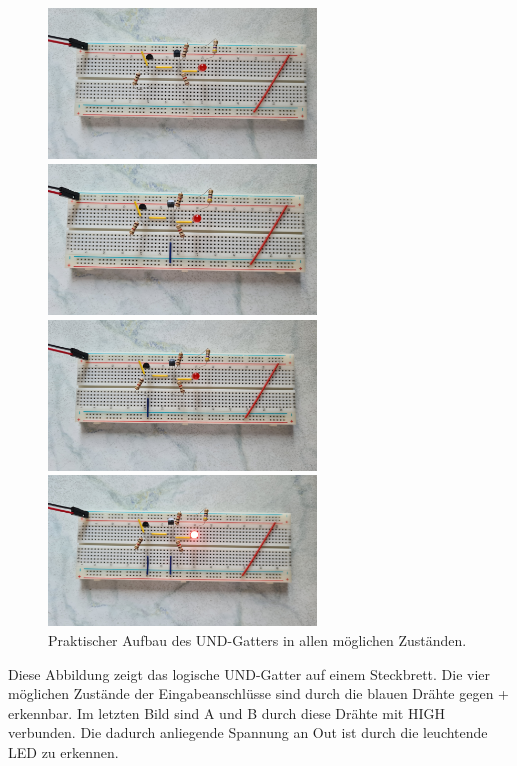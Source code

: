 \begin{figure}[h!]
	\begin{minipage}{.5\textwidth}
		\centering
		\includegraphics[height=4cm, keepaspectratio]{./Fotos/UND-00.jpg}
		\vspace{1cm}
	\end{minipage}%
	\begin{minipage}{.5\textwidth}
		\centering
		\includegraphics[height=4cm, keepaspectratio]{./Fotos/UND-01.jpg}
		\vspace{1cm}
	\end{minipage}
	\begin{minipage}{.5\textwidth}
		\centering
		\includegraphics[height=4cm, keepaspectratio]{./Fotos/UND-10.jpg}
	\end{minipage}%
	\begin{minipage}{.5\textwidth}
		\centering
		\includegraphics[height=4cm, keepaspectratio]{./Fotos/UND-11.jpg}
	\end{minipage}
	\caption{Praktischer Aufbau des UND-Gatters in allen möglichen Zuständen.}
\end{figure}
Diese Abbildung zeigt das logische UND-Gatter auf einem Steckbrett. Die vier möglichen Zustände der Eingabeanschlüsse sind durch die blauen Drähte gegen \glqq{}+\grqq{} erkennbar. Im letzten Bild sind A und B durch diese Drähte mit HIGH verbunden. Die dadurch anliegende Spannung an Out ist durch die leuchtende LED zu erkennen.

